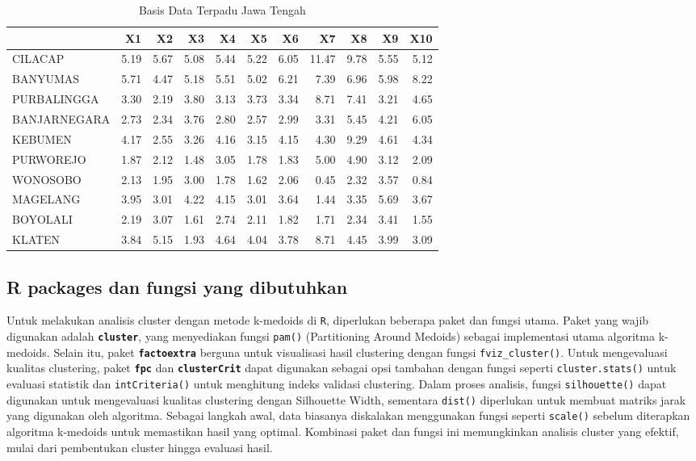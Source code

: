 \documentclass[
  oneside]{book}
\begin{document}
\begin{table}

\caption{\label{tab:nice-tab-1}Basis Data Terpadu Jawa Tengah}
\centering
\begin{tabular}[t]{lrrrrrrrrrr}
\toprule
  & X1 & X2 & X3 & X4 & X5 & X6 & X7 & X8 & X9 & X10\\
\midrule
CILACAP & 5.19 & 5.67 & 5.08 & 5.44 & 5.22 & 6.05 & 11.47 & 9.78 & 5.55 & 5.12\\
BANYUMAS & 5.71 & 4.47 & 5.18 & 5.51 & 5.02 & 6.21 & 7.39 & 6.96 & 5.98 & 8.22\\
PURBALINGGA & 3.30 & 2.19 & 3.80 & 3.13 & 3.73 & 3.34 & 8.71 & 7.41 & 3.21 & 4.65\\
BANJARNEGARA & 2.73 & 2.34 & 3.76 & 2.80 & 2.57 & 2.99 & 3.31 & 5.45 & 4.21 & 6.05\\
KEBUMEN & 4.17 & 2.55 & 3.26 & 4.16 & 3.15 & 4.15 & 4.30 & 9.29 & 4.61 & 4.34\\
\addlinespace
PURWOREJO & 1.87 & 2.12 & 1.48 & 3.05 & 1.78 & 1.83 & 5.00 & 4.90 & 3.12 & 2.09\\
WONOSOBO & 2.13 & 1.95 & 3.00 & 1.78 & 1.62 & 2.06 & 0.45 & 2.32 & 3.57 & 0.84\\
MAGELANG & 3.95 & 3.01 & 4.22 & 4.15 & 3.01 & 3.64 & 1.44 & 3.35 & 5.69 & 3.67\\
BOYOLALI & 2.19 & 3.07 & 1.61 & 2.74 & 2.11 & 1.82 & 1.71 & 2.34 & 3.41 & 1.55\\
KLATEN & 3.84 & 5.15 & 1.93 & 4.64 & 4.04 & 3.78 & 8.71 & 4.45 & 3.99 & 3.09\\
\bottomrule
\end{tabular}
\end{table}

\subsection*{R packages dan fungsi yang dibutuhkan}\label{r-packages-dan-fungsi-yang-dibutuhkan}

Untuk melakukan analisis cluster dengan metode k-medoids di \texttt{R}, diperlukan beberapa paket dan fungsi utama. Paket yang wajib digunakan adalah \textbf{\texttt{cluster}}, yang menyediakan fungsi \texttt{pam()} (Partitioning Around Medoids) sebagai implementasi utama algoritma k-medoids. Selain itu, paket \textbf{\texttt{factoextra}} berguna untuk visualisasi hasil clustering dengan fungsi \texttt{fviz\_cluster()}. Untuk mengevaluasi kualitas clustering, paket \textbf{\texttt{fpc}} dan \textbf{\texttt{clusterCrit}} dapat digunakan sebagai opsi tambahan dengan fungsi seperti \texttt{cluster.stats()} untuk evaluasi statistik dan \texttt{intCriteria()} untuk menghitung indeks validasi clustering. Dalam proses analisis, fungsi \texttt{silhouette()} dapat digunakan untuk mengevaluasi kualitas clustering dengan Silhouette Width, sementara \texttt{dist()} diperlukan untuk membuat matriks jarak yang digunakan oleh algoritma. Sebagai langkah awal, data biasanya diskalakan menggunakan fungsi seperti \texttt{scale()} sebelum diterapkan algoritma k-medoids untuk memastikan hasil yang optimal. Kombinasi paket dan fungsi ini memungkinkan analisis cluster yang efektif, mulai dari pembentukan cluster hingga evaluasi hasil.
\end{document}
